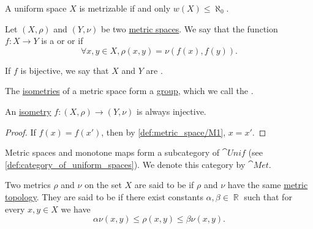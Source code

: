 \begin{theorem}\label{thm:countable_uniform_base_implies_metrizable}
  A uniform space \( X \) is metrizable if and only \( w(X) \leq \aleph_0 \).
\end{theorem}

\medskip

\begin{definition}\label{def:isometry}
  Let \( (X, \rho) \) and \( (Y, \nu) \) be two \hyperref[def:metric_space]{metric spaces}. We say that the function \( f: X \to Y \) is a  or  or  if
  \begin{equation*}
    \forall x, y \in X, \rho(x, y) = \nu(f(x), f(y)).
  \end{equation*}

  If \( f \) is bijective, we say that \( X \) and \( Y \) are .
\end{definition}

\begin{definition}\label{def:isometry_group}\mimprovised
  The \hyperref[def:isometry]{isometries} of a metric space form a \hyperref[def:group]{group}, which we call the .
\end{definition}

\begin{proposition}\label{thm:isometry_is_injective}
  An \hyperref[def:isometry]{isometry} \( f: (X, \rho) \to (Y, \nu) \) is always injective.
\end{proposition}
\begin{proof}
  If \( f(x) = f(x') \), then by \ref{def:metric_space/M1}, \( x = x' \).
\end{proof}

\begin{definition}\label{def:category_of_metric_spaces}
  Metric spaces and monotone maps form a subcategory of \( \cat{Unif} \) (see \cref{def:category_of_uniform_spaces}). We denote this category by \( \cat{Met} \).
\end{definition}

\begin{definition}\label{def:equivalent_metrics}
  Two metrics \( \rho \) and \( \nu \) on the set \( X \) are said to be  if \( \rho \) and \( \nu \) have the same \hyperref[def:metric_topology]{metric topology}. They are said to be  if there exist constants \( \alpha, \beta \in \BbbR \) such that for every \( x, y \in X \) we have
  \begin{equation*}
    \alpha \nu(x, y) \leq \rho(x, y) \leq \beta \nu(x, y).
  \end{equation*}
\end{definition}


